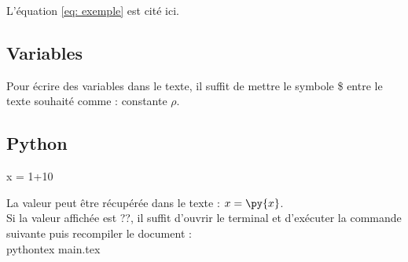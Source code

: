 \documentclass[a4paper,12pt]{article} %
\begin{document}
L'équation \ref{eq: exemple} est cité ici. 

\subsection{Variables}

Pour écrire des variables dans le texte, il suffit de mettre le symbole \$ entre le texte souhaité comme : constante $\rho$.

\subsection{Python}

\begin{pycode}
x = 1+10
\end{pycode}
       
La valeur peut être récupérée dans le texte : $x = \py{x}$.\\
Si la valeur affichée est ??, il suffit d'ouvrir le terminal et d'exécuter la 
commande suivante puis recompiler le document :\\
pythontex main.tex     
\end{document}
